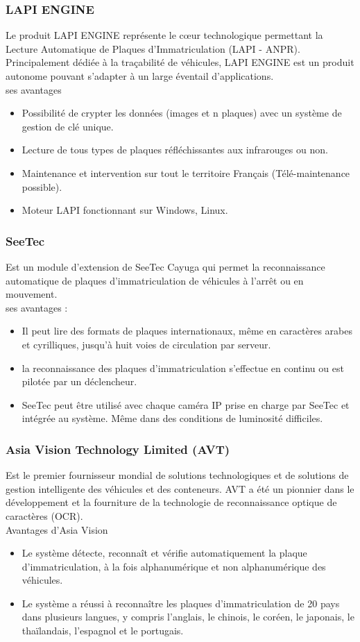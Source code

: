 \documentclass[11pt]{report}
\begin{document}
\subsubsection{LAPI ENGINE}
Le produit LAPI ENGINE représente le cœur technologique permettant la
Lecture Automatique de Plaques d’Immatriculation (LAPI - ANPR). Principalement
dédiée à la traçabilité de véhicules, LAPI ENGINE est un produit autonome pouvant
s’adapter à un large éventail d’applications.\\
ses avantages
\begin{itemize}
\item Possibilité de crypter les données (images et n plaques) avec un système de
gestion de clé unique.
\item Lecture de tous types de plaques réfléchissantes aux infrarouges ou non.
\item Maintenance et intervention sur tout le territoire Français (Télé-maintenance
possible).
\item  Moteur LAPI fonctionnant sur Windows, Linux.
\end{itemize}

\subsubsection{SeeTec}
Est un module d'extension de SeeTec Cayuga qui permet la reconnaissance
automatique de plaques d'immatriculation de véhicules à l'arrêt ou en mouvement.\\
ses avantages :
\begin{itemize}
\item Il peut lire des formats de plaques internationaux, même en caractères arabes
et cyrilliques, jusqu'à huit voies de circulation par serveur.
\item la reconnaissance des plaques d'immatriculation s'effectue en continu ou est
pilotée par un déclencheur.
\item SeeTec peut être utilisé avec chaque caméra IP prise en charge par SeeTec et
intégrée au système. Même dans des conditions de luminosité difficiles.
\end{itemize}

\subsubsection{Asia Vision Technology Limited (AVT)}
Est le premier fournisseur mondial de solutions technologiques et de solutions
de gestion intelligente des véhicules et des conteneurs. AVT a été un pionnier dans le
développement et la fourniture de la technologie de reconnaissance optique de
caractères (OCR).\\
Avantages d’Asia Vision
\begin{itemize}
\item Le système détecte, reconnaît et vérifie automatiquement la plaque
d'immatriculation, à la fois alphanumérique et non alphanumérique des
véhicules.
\item Le système a réussi à reconnaître les plaques d'immatriculation de 20 pays dans
plusieurs langues, y compris l'anglais, le chinois, le coréen, le japonais, le
thaïlandais, l'espagnol et le portugais.
\end{itemize}
\end{document}
